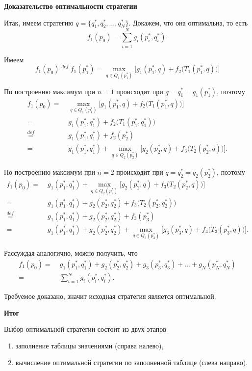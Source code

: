 \bigskip

\textbf{Доказательство оптимальности стратегии}

Итак, имеем стратегию $q = \{q_1^*, q_2^*, \dots, q_N^*\}$. Докажем, что она оптимальна, то есть
\[
f_1(p_0) = \sum_{i=1}^N g_i(p_i^*, q_i^*).
\]

Имеем
\[
f_1(p_0) \stackrel{def}{=} f_1(p_1^*) = \max_{q \in Q_{1}(p_1^*)} \Big[g_1(p_1^*, q) + f_{2}\big(T_{1}(p_1^*, q)\big)\Big]
\]

По построению максимум при $n=1$ происходит при $q = q_1^* = q_1(p_1^*)$, поэтому
\begin{align*}
	f_1(p_0) =& \; \max_{q \in Q_{1}(p_1^*)} \Big[g_1(p_1^*, q) + f_{2}\big(T_{1}(p_1^*, q)\big)\Big] \\
	=& \; g_1(p_1^*, q_1^*) + f_{2}\big(T_{1}(p_1^*, q_1^*)\big) \\
	\stackrel{def}{=}& \; g_1(p_1^*, q_1^*) + f_2(p_2^*) \\
	=& \; g_1(p_1^*, q_1^*) + \max_{q \in Q_{2}(p_2^*)} \Big[g_2(p_2^*, q) + f_{3}\big(T_{2}(p_2^*, q)\big)\Big].
\end{align*}

По построению максимум при $n=2$ происходит при $q = q_2^* = q_2(p_2^*)$, поэтому
\begin{align*}
	f_1(p_0) =& \; g_1(p_1^*, q_1^*) + \max_{q \in Q_{2}(p_2^*)} \Big[g_2(p_2^*, q) + f_{3}\big(T_{2}(p_2^*, q)\big)\Big] \\
	=& \; g_1(p_1^*, q_1^*) + g_2(p_2^*, q_2^*) + f_{3}\big(T_{2}(p_2^*, q_2^*)\big) \\
	\stackrel{def}{=}& \; g_1(p_1^*, q_1^*) + g_2(p_2^*, q_2^*) + f_3(p_3^*) \\
	=& \; g_1(p_1^*, q_1^*) + g_2(p_2^*, q_2^*) + \max_{q \in Q_{3}(p_3^*)} \Big[g_3(p_3^*, q) + f_{4}\big(T_{3}(p_3^*, q)\big)\Big].
\end{align*}

Рассуждая аналогично, можно получить, что
\begin{align*}
	f_1(p_0) =& \; g_1(p_1^*, q_1^*) + g_2(p_2^*, q_2^*) + g_3(p_3^*, q_3^*) + \dots + g_N(p_N^*, q_N^*) \\
	=& \; \sum_{i=1}^N g_i(p_i^*, q_i^*).
\end{align*}

Требуемое доказано, значит исходная стратегия является оптимальной.

\bigskip

\textbf{Итог}

Выбор оптимальной стратегии состоит из двух этапов
\begin{enumerate}[nosep]
	\item заполнение таблицы значениями (справа налево),
	
	\item вычисление оптимальной стратегии по заполненной таблице (слева направо).
\end{enumerate}

